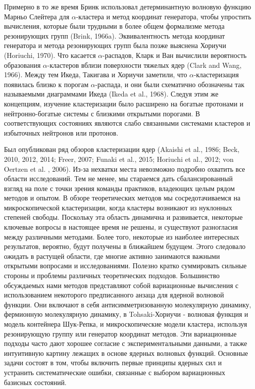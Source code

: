 \documentclass[fontsize=14pt]{scrreport}
\begin{document}
Примерно в то же время Бринк использовал детерминантную волновую функцию Марньо Слейтера для $\alpha$-кластера и метод координат генератора, чтобы упростить вычисления, которые были трудными в более общем формализме метода резонирующих групп (Brink, 1966a). Эквивалентность метода координат генератора и метода резонирующих групп была позже выяснена Хориучи (Horiuchi, 1970). Что касается $\alpha$-распадов, Кларк и Ван вычислили вероятность образования $\alpha$-кластеров вблизи поверхности тяжелых ядер (Clark and Wang, 1966). Между тем Икеда, Такигава и Хориучи заметили, что $\alpha$-кластеризация появилась близко к порогам $\alpha$-распада, и они были схематично обозначены так называемыми диаграммами Икеда (Ikeda et al., 1968). Следуя этим же концепциям, изучение кластеризации было расширено на богатые протонами и нейтронно-богатые системы с близкими открытыми порогами. В соответствующих состояниях являются слабо связанными системами кластеров и избыточных нейтронов или протонов. 

Был опубликован ряд обзоров кластеризации ядер (Akaishi et al., 1986; Beck, 2010, 2012, 2014; Freer, 2007; Funaki et al., 2015; Horiuchi et al., 2012; von Oertzen et al. , 2006). Из-за нехватки места невозможно подробно охватить все области исследований. Тем не менее, мы стараемся дать сбалансированный взгляд на поле с точки зрения команды практиков, владеющих целым рядом методов и опытом. В обзоре теоретических методов мы сосредотачиваемся на микроскопической кластеризации, когда кластеры возникают из нуклонных степеней свободы. Поскольку эта область динамична и развивается, некоторые ключевые вопросы в настоящее время не решены, и существуют разногласия между различными методами. Более того, некоторые из наиболее интересных результатов, вероятно, будут получены в ближайшем будущем. Этого следовало ожидать в растущей области, где многие активно занимаются важными открытыми вопросами и исследованиями. Полезно кратко суммировать сильные стороны и проблемы различных теоретических подходов. Большинство обсуждаемых нами методов представляют собой вариационные вычисления с использованием некоторого предписанного анзаца для ядерной волновой функции. Они включают в себя антисимметризованную молекулярную динамику, фермионную молекулярную динамику, в Tohsaki-Хориучи - волновая функция и модель контейнера Шук-Репка, и микроскопические модели кластера, используя резонирующую группу или генератор координат методов. Эти вариационные подходы часто дают хорошее согласие с экспериментальными данными, а также интуитивную картину лежащих в основе ядерных волновых функций. Основные задачи состоят в том, чтобы включить первые принципы ядерных сил и устранить систематические ошибки, связанные с выбором вариационных базисных состояний.
\end{document}
